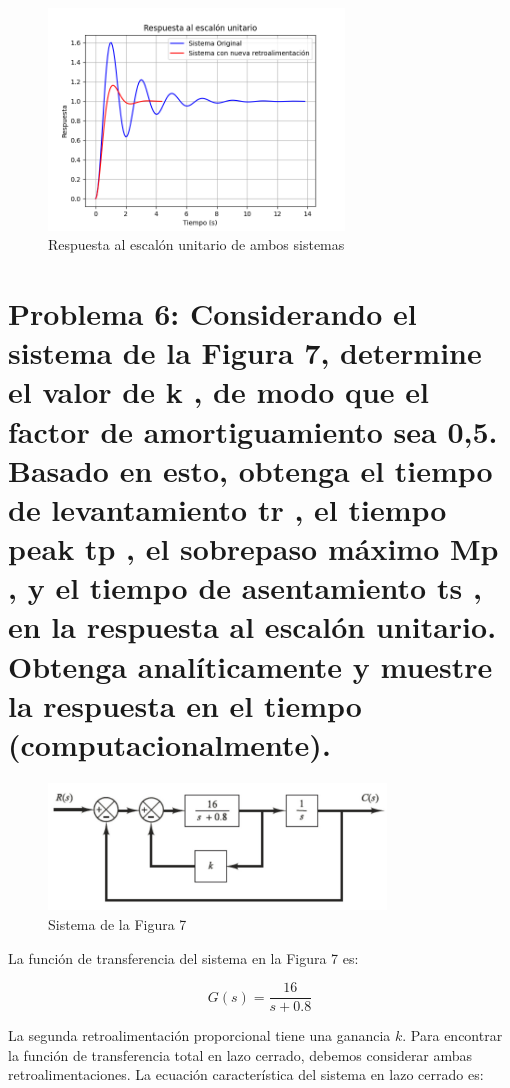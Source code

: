 \documentclass[10pt]{article}
\theoremstyle{definition}
\theoremstyle{remark}
\theoremstyle{definition}
\numberwithin{equation}{prob}
\begin{document}
\begin{figure}[h]
	\centering
	\includegraphics[width=0.7\textwidth]{./figures/Figura 6 ejercicio 5.png}
	\caption{Respuesta al escalón unitario de ambos sistemas}
\end{figure}

\newpage

\section{Problema 6: Considerando el sistema de la Figura 7, determine el valor de k , de modo que el factor de
amortiguamiento sea 0,5. Basado en esto, obtenga el tiempo de levantamiento tr , el tiempo
peak tp , el sobrepaso máximo Mp , y el tiempo de asentamiento ts , en la respuesta al escalón
unitario. Obtenga analíticamente y muestre la respuesta en el tiempo (computacionalmente).}

\begin{figure}[h]
	\centering
	\includegraphics[width=0.8\textwidth]{./figures/Figura 7 ejercicio 6.png}
	\caption{Sistema de la Figura 7}
\end{figure}


La función de transferencia del sistema en la Figura 7 es:

\[
G(s) = \frac{16}{s + 0.8}
\]

La segunda retroalimentación proporcional tiene una ganancia \(k\). Para encontrar la función de transferencia total en lazo cerrado, debemos considerar ambas retroalimentaciones. La ecuación característica del sistema en lazo cerrado es:
\end{document}
